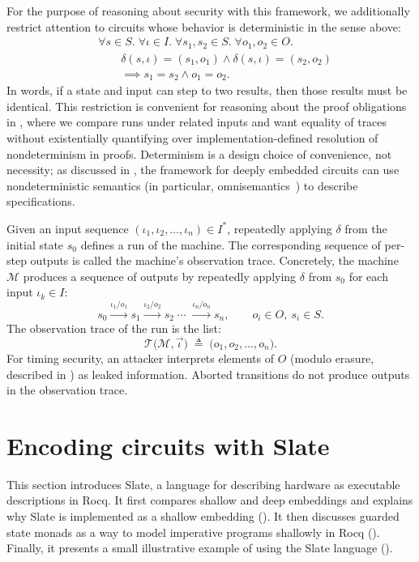 \documentclass[fontset=fira-newtxsf]{mitthesis}
\theoremstyle{definition}
\theoremstyle{plain}
\begin{document}
For the purpose of reasoning about security with this framework, we additionally restrict attention to circuits whose behavior is deterministic in the sense above:
\[
  \begin{aligned}
  &\forall s \in S.\; \forall \iota \in I.\;
    \forall s_1,s_2 \in S.\; \forall o_1,o_2 \in O.\\
  &\qquad
    \delta(s,\iota) = (s_1,o_1)
    \land
    \delta(s,\iota) = (s_2,o_2)\\
  &\qquad\implies
    s_1 = s_2 \land o_1 = o_2.
  \end{aligned}
\]
In words, if a state and input can step to two results, then those results must be identical.
This restriction is convenient for reasoning about the proof obligations in , where we compare runs under related inputs and want equality of traces without existentially quantifying over implementation-defined resolution of nondeterminism in proofs.
Determinism is a design choice of convenience, not necessity; as discussed in , the framework for deeply embedded circuits can use nondeterministic semantics (in particular, omnisemantics~\cite{chargueraud2023}) to describe specifications.

Given an input sequence $(\iota_1, \iota_2, \ldots, \iota_n) \in I^*$, repeatedly applying $\delta$ from the initial state $s_0$ defines a run of the machine.
The corresponding sequence of per-step outputs is called the machine's observation trace.
Concretely, the machine $\mathcal{M}$ produces a sequence of outputs by repeatedly applying $\delta$ from $s_0$ for each input $\iota_k \in I$:
\[
  s_0 \xrightarrow{\iota_1 / o_1} s_1 \xrightarrow{\iota_2 / o_2} s_2 \;\cdots\; \xrightarrow{\iota_n / o_n} s_n, \qquad o_i \in O,\ s_i \in S.
\]
The observation trace of the run is the list:
\[
  \mathcal{T}\bigl( \mathcal{M}, \vec\iota \bigr) \;\triangleq\; \bigl(o_1,o_2,\ldots,o_n \bigr)
.\]
For timing security, an attacker interprets elements of $O$ (modulo erasure, described in ) as leaked information.
Aborted transitions do not produce outputs in the observation trace.

\section{Encoding circuits with Slate} \label{sec:timing-monads}

This section introduces Slate, a language for describing hardware as executable descriptions in Rocq.
It first compares shallow and deep embeddings and explains why Slate is implemented as a shallow embedding ().
It then discusses guarded state monads as a way to model imperative programs shallowly in Rocq ().
Finally, it presents a small illustrative example of using the Slate language ().
\end{document}
